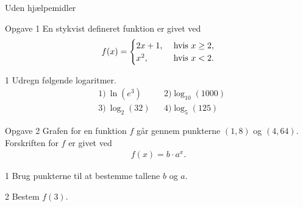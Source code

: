 \documentclass[12pt,x11names,a4paper]{article}
\begin{document}
\begin{center}
	\LARGE Uden hjælpemidler
\end{center}
\begin{opgavetekst}{Opgave 1}
	En stykvist defineret funktion er givet ved
	\begin{align*}
		f(x) = \begin{cases}
			2x + 1, &\textnormal{ hvis } x \geq 2,\\
			x^2, &\textnormal{ hvis } x < 2.
		\end{cases}
	\end{align*}
\end{opgavetekst}
\begin{delopgave}{}{1}
	Udregn følgende logaritmer.
	\begin{align*}
		&1) \ \ln(e^3) &   &2) \log_{10}(1000)\\
		&3) \ \log_2(32) &   & 4) \log_5(125) 
	\end{align*}
\end{delopgave}
\begin{opgavetekst}{Opgave 2}
	Grafen for en funktion $f$ går gennem punkterne $(1,8)$ og $(4,64)$. Forskriften for $f$ er givet ved
	\begin{align*}
		f(x) = b\cdot a^x.
	\end{align*}
\end{opgavetekst}
\begin{delopgave}{}{1}
	Brug punkterne til at bestemme tallene $b$ og $a$.
\end{delopgave}
\begin{delopgave}{}{2}
	Bestem $f(3)$.
\end{delopgave}
\end{document}
